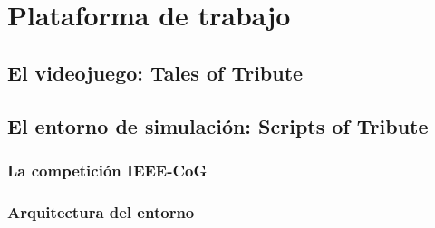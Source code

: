 \chapter{Plataforma de trabajo}

\section{El videojuego: Tales of Tribute}

\section{El entorno de simulación: Scripts of Tribute}

\subsection{La competición IEEE-CoG}

\subsection{Arquitectura del entorno}
